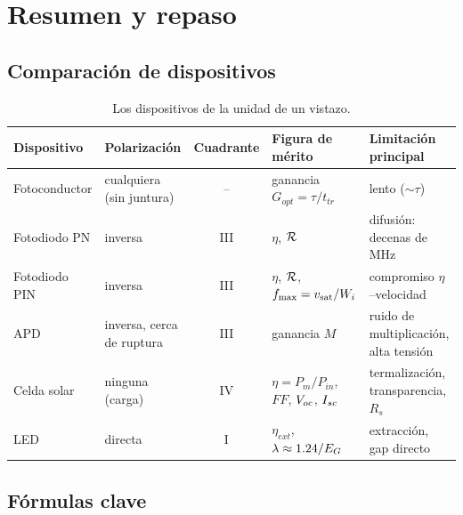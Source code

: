 \section{Resumen y repaso}

\subsection{Comparación de dispositivos}

\begin{table}[H]
\centering\small
\caption{Los dispositivos de la unidad de un vistazo.}
\label{tab:comparacion}
\begin{tabularx}{\textwidth}{l>{\raggedright\arraybackslash}p{2.6cm}c>{\raggedright\arraybackslash}X>{\raggedright\arraybackslash}X}
\toprule
Dispositivo & Polarización & Cuadrante & Figura de mérito & Limitación principal \\
\midrule
Fotoconductor & cualquiera (sin juntura) & -- & ganancia $G_{opt}=\tau/t_{tr}$ & lento ($\sim\tau$) \\
Fotodiodo PN  & inversa & III & $\eta$, $\mathcal{R}$ & difusión: decenas de MHz \\
Fotodiodo PIN & inversa & III & $\eta$, $\mathcal{R}$, $f_{\max}=v_{\mathrm{sat}}/W_i$ & compromiso $\eta$--velocidad \\
APD           & inversa, cerca de ruptura & III & ganancia $M$ & ruido de multiplicación, alta tensión \\
Celda solar   & ninguna (carga) & IV & $\eta=P_m/P_{in}$, $FF$, $V_{oc}$, $I_{sc}$ & termalización, transparencia, $R_s$ \\
LED           & directa & I & $\eta_{ext}$, $\lambda\approx1.24/E_G$ & extracción, gap directo \\
\bottomrule
\end{tabularx}
\end{table}

\subsection{Fórmulas clave}

